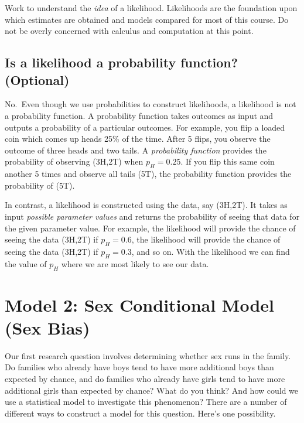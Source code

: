 \documentclass[
]{krantz}
\begin{document}
Work to understand the \emph{idea} of a likelihood. Likelihoods are the foundation upon which estimates are obtained and models compared for most of this course. Do not be overly concerned with calculus and computation at this point.

\hypertarget{is-a-likelihood-a-probability-function-optional}{%
\subsection{Is a likelihood a probability function? (Optional)}\label{is-a-likelihood-a-probability-function-optional}}

No.~Even though we use probabilities to construct likelihoods, a likelihood is not a probability function. A probability function takes outcomes as input and outputs a probability of a particular outcomes. For example, you flip a loaded coin which comes up heads 25\% of the time. After 5 flips, you observe the outcome of three heads and two tails. A \emph{probability function} provides the probability of observing (3H,2T) when \(p_H=0.25\). If you flip this same coin another 5 times and observe all tails (5T), the probability function provides the probability of (5T).

In contrast, a likelihood is constructed using the data, say (3H,2T). It takes as input \emph{possible parameter values} and returns the probability of seeing that data for the given parameter value. For example, the likelihood will provide the chance of seeing the data (3H,2T) if \(p_H=0.6\), the likelihood will provide the chance of seeing the data (3H,2T) if \(p_H=0.3\), and so on. With the likelihood we can find the value of \(p_H\) where we are most likely to see our data.

\hypertarget{sex_conditional.sec}{%
\section{Model 2: Sex Conditional Model (Sex Bias)}\label{sex_conditional.sec}}

Our first research question involves determining whether sex runs in the family. Do families who already have boys tend to have more additional boys than expected by chance, and do families who already have girls tend to have more additional girls than expected by chance? What do you think? And how could we use a statistical model to investigate this phenomenon? There are a number of different ways to construct a model for this question. Here's one possibility.
\end{document}
